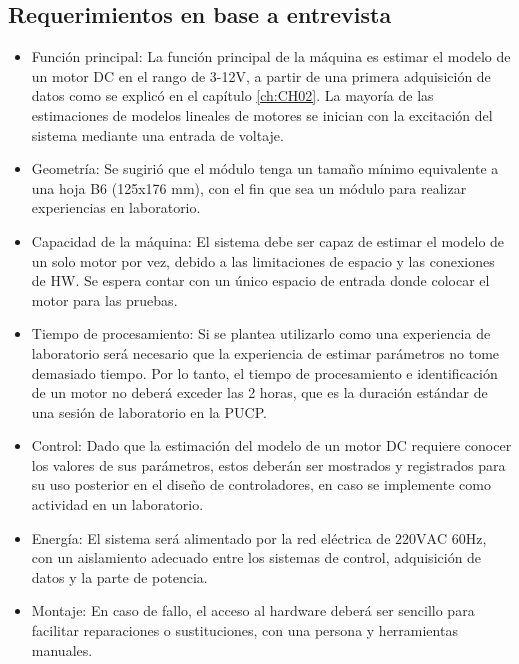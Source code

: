 \subsection{Requerimientos en base a entrevista}
    \begin{itemize}
       \item Función principal: 
       La función principal de la máquina es estimar el modelo de un motor \ac{DC} en el rango de 3-12V, a partir de una primera adquisición de datos como se explicó en el capítulo \ref{ch:CH02}. La mayoría de las estimaciones de modelos lineales de motores se inician con la excitación del sistema mediante una entrada de voltaje. 
       
       \item Geometría:
       Se sugirió que el módulo tenga un tamaño mínimo equivalente a una hoja B6 (125x176 mm), con el fin que sea un módulo para realizar experiencias en laboratorio.
       
       \item Capacidad de la máquina: 
       El sistema debe ser capaz de estimar el modelo de un solo motor por vez, debido a las limitaciones de espacio y las conexiones de \ac{HW}. Se espera contar con un único espacio de entrada donde colocar el motor para las pruebas.
       \item Tiempo de procesamiento:  
       Si se plantea utilizarlo como una experiencia de laboratorio será necesario que la experiencia de estimar parámetros no tome demasiado tiempo. Por lo tanto, el tiempo de procesamiento e identificación de un motor no deberá exceder las 2 horas, que es la duración estándar de una sesión de laboratorio en la PUCP.
       
       \item Control: 
       Dado que la estimación del modelo de un motor \ac{DC} requiere conocer los valores de sus parámetros, estos deberán ser mostrados y registrados para su uso posterior en el diseño de controladores, en caso se implemente como actividad en un laboratorio.
       
       \item Energía:  
       El sistema será alimentado por la red eléctrica de $220\text{VAC }60\text{Hz}$, con un aislamiento adecuado entre los sistemas de control, adquisición de datos y la parte de potencia.
       
        \item Montaje: 
        En caso de fallo, el acceso al hardware deberá ser sencillo para facilitar reparaciones o sustituciones, con una persona y herramientas manuales.
        

\end{itemize}
